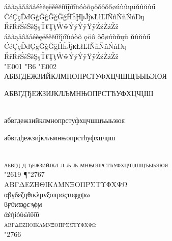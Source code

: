 \documentclass[pagesize,DIV14]{scrartcl}
\begin{document}
\begin{center}
{áàãąäǎâăåéèẽęëěêĕíìĩįïǐîĭıóòõǫöǒôǒőøúùũųüǔûŭůű\\
ĆćÇçĎďĢģĜĝǦǧĞğĤĥḨḩĴĵĸŁłĽľÑñŇňŃńŊŋ\\
ŘřŔŕŚśŠšŞşŤťŢţŴŵÝýŶŷŸÿŹźŻżŽž\\
{%
áàãąäâăåéèęëěêĕíìĩįïîĭıóòõ%
{ǫ}öô%
{ǒ}őøúùũųü%
{ǔ}ûŭůű\\
ĆćÇçĎďĢģĜĝĞğĤĥĴĵĸŁłĽľÑñŇňŃńŊŋ\\
ŘřŔŕŚśŠšŞşŤťŢţŴŵÝýŶŷŸÿŹźŻżŽž}\\
{\Huge \char"E001 \char"B6 \char"E002}\\
АБВГДЕЖЗИЙКЛМНОПРСТУФХЦЧШЩЪЫЬЭЮЯ\\
\begin{serbian}	{%
	АБВГДЂЕЖЗИЈКЛЉМНЊОПРСТЋУФХЦЧЏШ}
\end{serbian}\\
абвгдежзийклмнопрстуфхцчшщъыьэюя\\
\begin{serbian}
	{%
	абвгдђежзијклљмнњопрстћуфхцчџш}
\end{serbian}\\
\textsc{абвгд%
	{д}%
	ђежзийјкл%
	{л}%
	љ%
	{љ}%
	мнњопрстћуфхцчџшщъыьэюя}\\
{\Huge \char"2619 {¶}\char"2767}\\
ΑΒΓΔΕΖΗΘΙΚΛΜΝΞΟΠΡΣΤΥΦΧΨΩ\\
αβγδεζηθικλμνξοπρσςτυφχψω\\
ϐϝϑϰϖϱϲϡϕϻ\\
άέήίόύώϊϋΐΰ\\
\textsc{αβγδεζηθικλμνξοπρσςτυφχψω}\\
{\Huge \char"2766}\\
}
\end{center}
\clearpage
\fontsize{16}{16}\itshape
\end{document}
